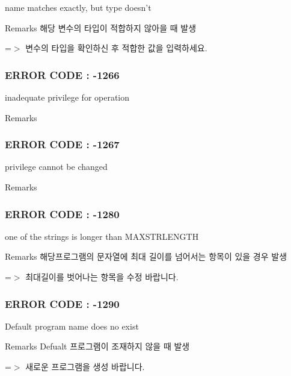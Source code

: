 name matches exactly, but type doesn't \begin{DoxyRemark}{Remarks}
해당 변수의 타입이 적합하지 않아을 때 발생 \par
 =$>$ 변수의 타입을 확인하신 후 적합한 값을 입력하세요.
\end{DoxyRemark}


 \subsubsection*{E\-R\-R\-O\-R C\-O\-D\-E \-: -\/1266 }

inadequate privilege for operation \begin{DoxyRemark}{Remarks}
\par

\end{DoxyRemark}


 \subsubsection*{E\-R\-R\-O\-R C\-O\-D\-E \-: -\/1267 }

privilege cannot be changed \begin{DoxyRemark}{Remarks}
\par

\end{DoxyRemark}


 \subsubsection*{E\-R\-R\-O\-R C\-O\-D\-E \-: -\/1280 }

one of the strings is longer than M\-A\-X\-S\-T\-R\-L\-E\-N\-G\-T\-H \begin{DoxyRemark}{Remarks}
해당프로그램의 문자열에 최대 길이를 넘어서는 항목이 있을 경우 발생\par
 =$>$ 최대길이를 벗어나는 항목을 수정 바랍니다.
\end{DoxyRemark}


 \subsubsection*{E\-R\-R\-O\-R C\-O\-D\-E \-: -\/1290 }

Default program name does no exist \begin{DoxyRemark}{Remarks}
Defualt 프로그램이 조재하지 않을 때 발생 \par
 =$>$ 새로운 프로그램을 생성 바랍니다.
\end{DoxyRemark}


